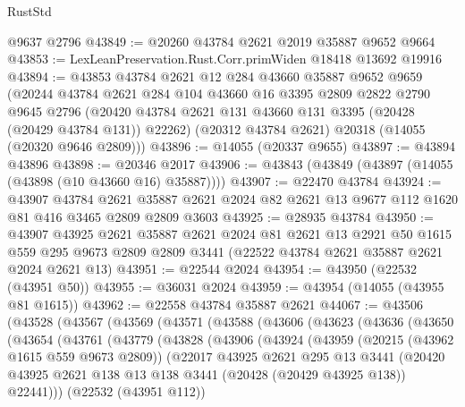 \begin{lexlean}{RustStd}
\begin{coremodule}
    @9637
    @2796
@43849 := @20260 @43784 @2621 @2019 @35887 @9652 @9664
@43853 := LexLeanPreservation.Rust.Corr.primWiden @18418 @13692 @19916
@43894 := @43853
    @43784
    @2621
    @12
    @284
    @43660
    @35887
    @9652
    @9659
    (@20244
      @43784
      @2621
      @284
      @104
      @43660
      @16
      @3395
      @2809
      @2822
      @2790
      @9645
      @2796
      (@20420 @43784 @2621 @131 @43660 @131 @3395 (@20428 (@20429 @43784 @131)) @22262)
      (@20312 @43784 @2621)
      @20318
      (@14055 (@20320 @9646 @2809)))
@43896 := @14055 (@20337 @9655)
@43897 := @43894 @43896
@43898 := @20346 @2017
@43906 := @43843 (@43849 (@43897 (@14055 (@43898 (@10 @43660 @16) @35887))))
@43907 := @22470 @43784
@43924 := @43907
    @43784
    @2621
    @35887
    @2621
    @2024
    @82
    @2621
    @13
    @9677
    @112
    @1620
    @81
    @416
    @3465
    @2809
    @2809
    @3603
@43925 := @28935 @43784
@43950 := @43907
    @43925
    @2621
    @35887
    @2621
    @2024
    @81
    @2621
    @13
    @2921
    @50
    @1615
    @559
    @295
    @9673
    @2809
    @2809
    @3441
    (@22522 @43784 @2621 @35887 @2621 @2024 @2621 @13)
@43951 := @22544 @2024
@43954 := @43950 (@22532 (@43951 @50))
@43955 := @36031 @2024
@43959 := @43954 (@14055 (@43955 @81 @1615))
@43962 := @22558 @43784 @35887 @2621
@44067 := @43506
    (@43528
      (@43567
        (@43569
          (@43571
            (@43588
              (@43606
                (@43623
                  (@43636
                    (@43650
                      (@43654
                        (@43761
                          (@43779
                            (@43828
                              (@43906
                                (@43924
                                  (@43959
                                    (@20215 (@43962 @1615 @559 @9673 @2809))
                                    (@22017
                                      @43925
                                      @2621
                                      @295
                                      @13
                                      @3441
                                      (@20420
                                        @43925
                                        @2621
                                        @138
                                        @13
                                        @138
                                        @3441
                                        (@20428 (@20429 @43925 @138))
                                        @22441)))
                                  (@22532 (@43951 @112))

\end{coremodule}
\end{lexlean}
